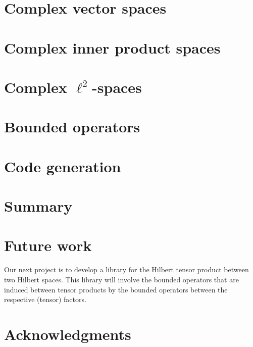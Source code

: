 \documentclass[12pt]{article}
\theoremstyle{definition}
\begin{document}
\section{Complex vector spaces}
\blindtext[6]

\section{Complex inner product spaces}
\blindtext[6]

\section{Complex $\ell^2$-spaces}
\blindtext[6]

\section{Bounded operators}
\blindtext[6]

\section{Code generation}
\blindtext[6]


\section{Summary}


\section{Future work}
Our next project is to develop a library for the Hilbert tensor product between two Hilbert spaces. This library will involve the bounded operators that are induced between tensor products by the bounded operators between the respective (tensor) factors.


\section*{Acknowledgments}
\blindtext[1]




\end{document}
